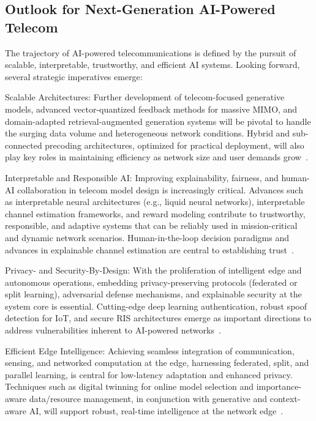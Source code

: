 \documentclass[sigconf]{acmart}
\begin{document}
\subsection{Outlook for Next-Generation AI-Powered Telecom}

The trajectory of AI-powered telecommunications is defined by the pursuit of scalable, interpretable, trustworthy, and efficient AI systems. Looking forward, several strategic imperatives emerge:

Scalable Architectures: Further development of telecom-focused generative models, advanced vector-quantized feedback methods for massive MIMO, and domain-adapted retrieval-augmented generation systems will be pivotal to handle the surging data volume and heterogeneous network conditions. Hybrid and sub-connected precoding architectures, optimized for practical deployment, will also play key roles in maintaining efficiency as network size and user demands grow~\cite{ref13,ref14,ref15,ref28}.

Interpretable and Responsible AI: Improving explainability, fairness, and human-AI collaboration in telecom model design is increasingly critical. Advances such as interpretable neural architectures (e.g., liquid neural networks), interpretable channel estimation frameworks, and reward modeling contribute to trustworthy, responsible, and adaptive systems that can be reliably used in mission-critical and dynamic network scenarios. Human-in-the-loop decision paradigms and advances in explainable channel estimation are central to establishing trust~\cite{ref43,ref44,ref45,ref49,ref35,ref38}.

Privacy- and Security-By-Design: With the proliferation of intelligent edge and autonomous operations, embedding privacy-preserving protocols (federated or split learning), adversarial defense mechanisms, and explainable security at the system core is essential. Cutting-edge deep learning authentication, robust spoof detection for IoT, and secure RIS architectures emerge as important directions to address vulnerabilities inherent to AI-powered networks~\cite{ref24,ref25,ref35,ref38,ref39}.

Efficient Edge Intelligence: Achieving seamless integration of communication, sensing, and networked computation at the edge, harnessing federated, split, and parallel learning, is central for low-latency adaptation and enhanced privacy. Techniques such as digital twinning for online model selection and importance-aware data/resource management, in conjunction with generative and context-aware AI, will support robust, real-time intelligence at the network edge~\cite{ref36,ref37,ref38,ref39,ref42,ref49}.
\end{document}
